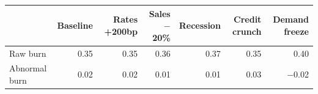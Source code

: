 \begin{tabular}{lrrrrrr}
\toprule
 & Baseline & Rates +200bp & Sales $-$20\% & Recession & Credit crunch & Demand freeze \\
\midrule
Raw burn & 0.35 & 0.35 & 0.36 & 0.37 & 0.35 & 0.40 \\
Abnormal burn & 0.02 & 0.02 & 0.01 & 0.01 & 0.03 & $-$0.02 \\
\bottomrule
\end{tabular}
